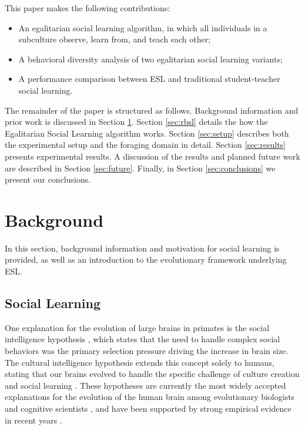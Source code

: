 \documentclass{sig-alternate}
\begin{document}
This paper makes the following contributions:
 
\begin{itemize}
\item An egalitarian social learning algorithm, in which all individuals in a subculture observe, learn from, and teach each other;
\item A behavioral diversity analysis of two egalitarian social learning variants;
\item A performance comparison between ESL and traditional student-teacher social learning.
\end{itemize}
 
The remainder of the paper is structured as follows.
Background information and prior work is discussed in Section \ref{sec:background}.
Section \ref{sec:rbsl} details the how the Egalitarian Social Learning algorithm works. Section \ref{sec:setup} describes both the experimental setup and the foraging domain in detail.
Section \ref{sec:results} presents experimental results.
A discussion of the results and planned future work are described in Section \ref{sec:future}.
Finally, in Section \ref{sec:conclusions} we present our conclusions.

\section{Background}
\label{sec:background}
In this section, background information and motivation for social learning is provided, as well as an introduction to the evolutionary framework underlying ESL.

\subsection*{Social Learning}

One explanation for the evolution of large brains in primates is the social intelligence hypothesis \cite{byrne1989machiavellian, humphrey1976social}, which states that the need to handle complex social behaviors was the primary selection pressure driving the increase in brain size. The cultural intelligence hypothesis extends this concept solely to humans, stating that our brains evolved to handle the specific challenge of culture creation and social learning \cite{tomasello1999cultural}. These hypotheses are currently the most widely accepted explanations for the evolution of the human brain among evolutionary biologists and cognitive scientists \cite{holekamp2007questioning}, and have been supported by strong empirical evidence in recent years \cite{herrmann2007humans}.  
\end{document}
